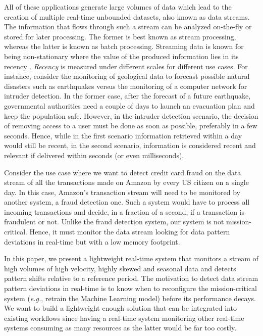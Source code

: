 \documentclass[sigconf]{acmart}
\begin{document}
All of these applications generate large volumes of data which lead to the creation of multiple real-time unbounded datasets, also known as data streams. The information that flows through such a stream can be analyzed on-the-fly or stored for later processing. The former is best known as stream processing, whereas the latter is known as batch processing. Streaming data is known for being non-stationary \cite{Gama-Knowledge-Discovery} where the value of the produced information lies in its recency \cite{Kolajo-Big-data-stream-SLR}. \textit{Recency} is measured under different scales for different use cases. For instance, consider the monitoring of geological data to forecast possible natural disasters such as earthquakes versus the monitoring of a computer network for intruder detection. In the former case, after the forecast of a future earthquake, governmental authorities need a couple of days to launch an evacuation plan and keep the population safe. However, in the intruder detection scenario, the decision of removing access to a user must be done as soon as possible, preferably in a few seconds. Hence, while in the first scenario information retrieved within a day would still be recent, in the second scenario, information is considered recent and relevant if delivered within seconds (or even milliseconds).

Consider the use case where we want to detect credit card fraud on the data stream of all the transactions made on Amazon by every US citizen on a single day. In this case, Amazon's transaction stream will need to be monitored by another system, a fraud detection one. Such a system would have to process all incoming transactions and decide, in a fraction of a second, if a transaction is fraudulent or not. Unlike the fraud detection system, our system is not mission-critical. Hence, it must monitor the data stream looking for data pattern deviations in real-time but with a low memory footprint.

In this paper, we present a lightweight real-time system that monitors a stream of high volumes of high velocity, highly skewed and seasonal data and detects pattern shifts relative to a reference period. The motivation to detect data stream pattern deviations in real-time is to know when to reconfigure the mission-critical system (\textit{e.g.}, retrain the Machine Learning model) before its performance decays. We want to build a lightweight enough solution that can be integrated into existing workflows since having a real-time system monitoring other real-time systems consuming as many resources as the latter would be far too costly.
\end{document}

